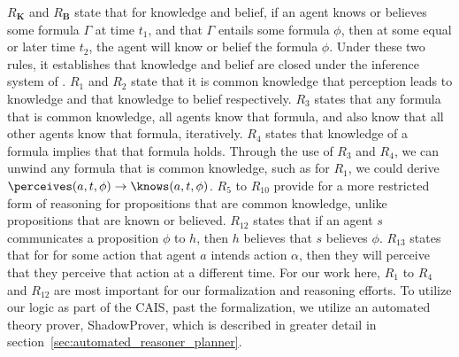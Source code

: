 $R_\mathbf{K}$ and $R_\mathbf{B}$ state that for knowledge and belief, if an
agent knows or believes some formula $\Gamma$ at time $t_{1}$, and that $\Gamma$
entails some formula $\phi$, then at some equal or later time $t_{2}$, the
agent will know or belief the formula $\phi$. Under these two rules, it
establishes that knowledge and belief are closed under the inference system of
\CEC. $R_{1}$ and $R_{2}$ state that it is common knowledge that perception
leads to knowledge and that knowledge to belief respectively. $R_{3}$ states that
any formula that is common knowledge, all agents know that formula, and also know
that all other agents know that formula, iteratively. $R_{4}$ states that
knowledge  of a formula implies that that formula holds. Through the use of
$R_{3}$ and $R_{4}$, we can unwind any formula that is common knowledge, such
as for $R_1$, we could derive
$\perceives(a, t, \phi) \rightarrow \knows(a, t, \phi)$. $R_5$ to $R_{10}$
provide for a more restricted form of reasoning for propositions that are common
knowledge, unlike propositions that are known or believed.  $R_{12}$
states that if an agent $s$ communicates a proposition $\phi$ to $h$,
then $h$ believes that $s$ believes $\phi$. $R_{13}$ states that for for some
action that agent $a$ intends action $\alpha$, then they will perceive that they
perceive that action at a different time. For our work here, $R_{1}$ to $R_{4}$
and $R_{12}$ are most important for our formalization and reasoning efforts.
To utilize our logic as part of the CAIS, past the formalization, we utilize
an automated theory prover, \textsf{ShadowProver}, which is described in greater
detail in section~\ref{sec:automated_reasoner_planner}.
